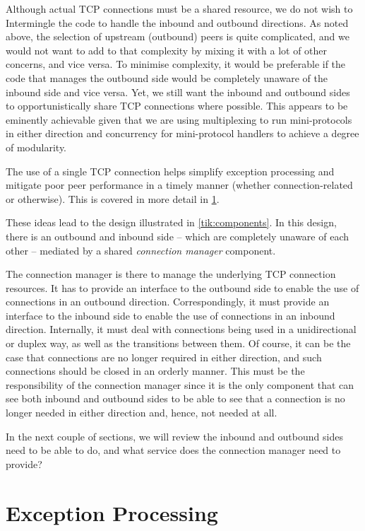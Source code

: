 Although actual TCP connections must be a shared resource, we do not wish to
Intermingle the code to handle the inbound and outbound directions. As noted
above, the selection of upstream (outbound) peers is quite complicated, and we
would not want to add to that complexity by mixing it with a lot of other
concerns, and vice versa.
To minimise complexity, it would be preferable if the code that manages
the outbound side would be completely unaware of the inbound side and vice
versa. Yet, we still want the inbound and outbound sides to opportunistically
share TCP connections where possible. This appears to be eminently achievable
given that we are using multiplexing to run mini-protocols in either direction
and concurrency for mini-protocol handlers to achieve a degree of modularity.

The use of a single TCP connection helps simplify exception processing
and mitigate poor peer performance in a timely manner (whether connection-related or
otherwise). This is covered in more detail in \cref{sec:exceptions}.

These ideas lead to the design illustrated in \cref{tik:components}. In this
design, there is an outbound and inbound side -- which are completely unaware of
each other -- mediated by a shared \emph{connection manager} component.

The connection manager is there to manage the underlying TCP connection
resources. It has to provide an interface to the outbound side to enable the
use of connections in an outbound direction. Correspondingly, it must provide an
interface to the inbound side to enable the use of connections in an inbound
direction. Internally, it must deal with connections being used in a
unidirectional or duplex way, as well as the transitions between them. Of course, it
can be the case that connections are no longer required in either direction,
and such connections should be closed in an orderly manner. This must be the
responsibility of the connection manager since it is the only component that
can see both inbound and outbound sides to be able to see that a connection is
no longer needed in either direction and, hence, not needed at all.

In the next couple of sections, we will review the inbound and outbound sides
need to be able to do, and what service does the connection manager need to provide?

\section{Exception Processing}
\label{sec:exceptions}

